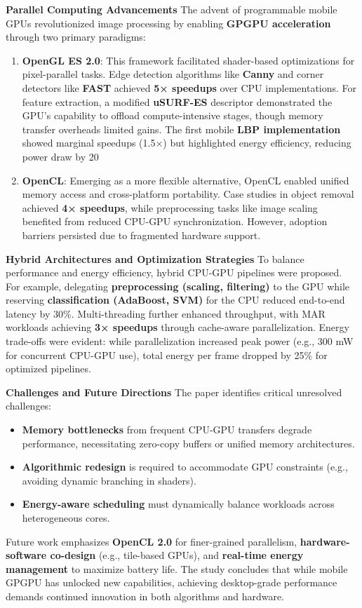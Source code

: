 \documentclass[conference]{IEEEtran}
\begin{document}
\textbf{Parallel Computing Advancements}  
The advent of programmable mobile GPUs revolutionized image processing by enabling \textbf{GPGPU acceleration} through two primary paradigms:
\begin{enumerate}
    \item \textbf{OpenGL ES 2.0}: This framework facilitated shader-based optimizations for pixel-parallel tasks. Edge detection algorithms like \textbf{Canny} and corner detectors like \textbf{FAST} achieved \textbf{5× speedups} over CPU implementations. For feature extraction, a modified \textbf{uSURF-ES} descriptor demonstrated the GPU’s capability to offload compute-intensive stages, though memory transfer overheads limited gains. The first mobile \textbf{LBP implementation} showed marginal speedups (1.5×) but highlighted energy efficiency, reducing power draw by 20%
    \item \textbf{OpenCL}: Emerging as a more flexible alternative, OpenCL enabled unified memory access and cross-platform portability. Case studies in object removal achieved \textbf{4× speedups}, while preprocessing tasks like image scaling benefited from reduced CPU-GPU synchronization. However, adoption barriers persisted due to fragmented hardware support.
\end{enumerate}

\noindent\textbf{Hybrid Architectures and Optimization Strategies}  
To balance performance and energy efficiency, hybrid CPU-GPU pipelines were proposed. For example, delegating \textbf{preprocessing (scaling, filtering)} to the GPU while reserving \textbf{classification (AdaBoost, SVM)} for the CPU reduced end-to-end latency by 30\%. Multi-threading further enhanced throughput, with MAR workloads achieving \textbf{3× speedups} through cache-aware parallelization. Energy trade-offs were evident: while parallelization increased peak power (e.g., 300 mW for concurrent CPU-GPU use), total energy per frame dropped by 25\% for optimized pipelines.

\textbf{Challenges and Future Directions}  
The paper identifies critical unresolved challenges:
\begin{itemize}
    \item \textbf{Memory bottlenecks} from frequent CPU-GPU transfers degrade performance, necessitating zero-copy buffers or unified memory architectures.
    \item \textbf{Algorithmic redesign} is required to accommodate GPU constraints (e.g., avoiding dynamic branching in shaders).
    \item \textbf{Energy-aware scheduling} must dynamically balance workloads across heterogeneous cores.
\end{itemize}
Future work emphasizes \textbf{OpenCL 2.0} for finer-grained parallelism, \textbf{hardware-software co-design} (e.g., tile-based GPUs), and \textbf{real-time energy management} to maximize battery life. The study concludes that while mobile GPGPU has unlocked new capabilities, achieving desktop-grade performance demands continued innovation in both algorithms and hardware.
\end{document}
